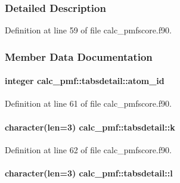 \subsubsection{Detailed Description}


Definition at line 59 of file calc\-\_\-pmfscore.\-f90.



\subsubsection{Member Data Documentation}
\hypertarget{structcalc__pmf_1_1tabsdetail_a40cc10447ed88b5a828d9611bab16b37}{
\paragraph[{atom\-\_\-id}]{\setlength{\rightskip}{0pt plus 5cm}integer calc\-\_\-pmf\-::tabsdetail\-::atom\-\_\-id}}\label{structcalc__pmf_1_1tabsdetail_a40cc10447ed88b5a828d9611bab16b37}


Definition at line 61 of file calc\-\_\-pmfscore.\-f90.

\hypertarget{structcalc__pmf_1_1tabsdetail_a83bcadffd205728a4a1a49df0fa85ef0}{
\paragraph[{k}]{\setlength{\rightskip}{0pt plus 5cm}character(len=3) calc\-\_\-pmf\-::tabsdetail\-::k}}\label{structcalc__pmf_1_1tabsdetail_a83bcadffd205728a4a1a49df0fa85ef0}


Definition at line 62 of file calc\-\_\-pmfscore.\-f90.

\hypertarget{structcalc__pmf_1_1tabsdetail_a470b6b66bc1e9c337de474165f50bd1b}{
\paragraph[{l}]{\setlength{\rightskip}{0pt plus 5cm}character(len=3) calc\-\_\-pmf\-::tabsdetail\-::l}}\label{structcalc__pmf_1_1tabsdetail_a470b6b66bc1e9c337de474165f50bd1b}


